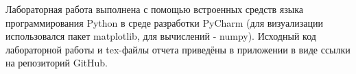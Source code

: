 \documentclass[../body.tex]{subfiles}
\begin{document}
	Лабораторная работа выполнена с помощью встроенных средств языка программирования Python в среде разработки PyCharm (для визуализации использовался пакет matplotlib, для вычислений - numpy). Исходный код лабораторной работы и tex-файлы отчета приведёны в приложении в виде ссылки на репозиторий GitHub.
	
	
\end{document}
